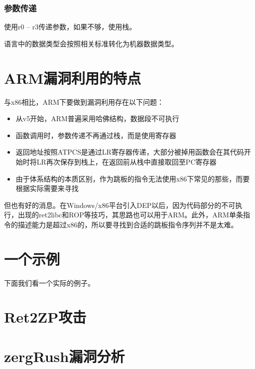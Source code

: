 \subsubsection{参数传递}

使用r0 – r3传递参数，如果不够，使用栈。

语言中的数据类型会按照相关标准转化为机器数据类型。
\section{ARM漏洞利用的特点}
与x86相比，ARM下要做到漏洞利用存在以下问题：
\begin{itemize}
\item 从v5开始，ARM普遍采用哈佛结构，数据段不可执行
\item 函数调用时，参数传递不再通过栈，而是使用寄存器
\item 返回地址按照ATPCS是通过LR寄存器传递，大部分被掉用函数会在其代码开始时将LR再次保存到栈上，在返回前从栈中直接取回至PC寄存器
\item 由于体系结构的本质区别，作为跳板的指令无法使用x86下常见的那些，而要根据实际需要来寻找
\end{itemize}
但也有好的消息。在Windows/x86平台引入DEP以后，因为代码部分的不可执行，出现的ret2libc和ROP等技巧，其思路也可以用于ARM。此外，ARM单条指令的描述能力是超过x86的，所以要寻找到合适的跳板指令序列并不是太难。
\section{一个示例}
下面我们看一个实际的例子。
\section{Ret2ZP攻击}
\section{zergRush漏洞分析}
